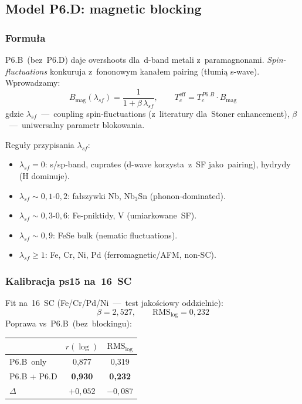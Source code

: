 \subsection{Model P6.D: magnetic blocking}
\label{sec:P6D}

\subsubsection{Formu\l{}a}

P6.B~(bez~P6.D) daje overshoots dla~d-band metali z~paramagnonami.
\emph{Spin-fluctuations} konkuruja z~fononowym kana\l{}em pairing
(t\l{}umi\k{a} s-wave). Wprowadzamy:
\[
  \boxed{B_\text{mag}(\lambda_{sf}) = \frac{1}{1+\beta\,\lambda_{sf}},
  \qquad T_c^\text{eff} = T_c^{P6.B} \cdot B_\text{mag}}
\]
gdzie $\lambda_{sf}$~---~coupling spin-fluctuations (z~literatury dla~Stoner
enhancement), $\beta$~---~uniwersalny parametr blokowania.

Regu\l{}y przypisania $\lambda_{sf}$:
\begin{itemize}\itemsep0pt
  \item $\lambda_{sf}=0$: s/sp-band, cuprates (d-wave korzysta~z~SF jako~pairing),
    hydrydy (H dominuje).
  \item $\lambda_{sf}\!\sim\!0{,}1$-$0{,}2$: fa\l{}szywki Nb, Nb$_3$Sn
    (phonon-dominated).
  \item $\lambda_{sf}\!\sim\!0{,}3$-$0{,}6$: Fe-pniktidy, V (umiarkowane~SF).
  \item $\lambda_{sf}\!\sim\!0{,}9$: FeSe bulk (nematic fluctuations).
  \item $\lambda_{sf}\!\ge\!1$: Fe, Cr, Ni, Pd (ferromagnetic/AFM, non-SC).
\end{itemize}

\subsubsection{Kalibracja ps15 na~16~SC}

Fit na~16~SC (Fe/Cr/Pd/Ni~---~test jako\'sciowy oddzielnie):
\[
  \beta = 2{,}527, \qquad \text{RMS}_\text{log} = 0{,}232
\]
Poprawa vs~P6.B~(bez~blockingu):
\begin{center}
\begin{tabular}{lcc}
\toprule
& $r(\log)$ & $\text{RMS}_\text{log}$ \\
\midrule
P6.B~only      & 0{,}877 & 0{,}319 \\
P6.B + P6.D    & \textbf{0{,}930} & \textbf{0{,}232} \\
\midrule
$\Delta$       & $+0{,}052$ & $-0{,}087$ \\
\bottomrule
\end{tabular}
\end{center}

